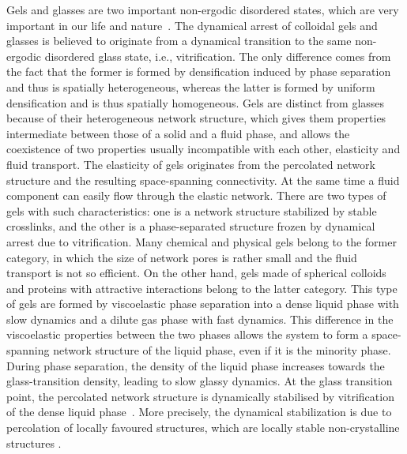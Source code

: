 \documentclass[twocolumn,showpacs,amsmath,amssymb,pre,superscriptaddress]{revtex4}
\begin{document}
\maketitle
Gels and glasses are two important non-ergodic disordered states, which are very important 
in our life and nature~\cite{anderson2002insights,lekkerkerker2011colloids}.
The dynamical arrest of colloidal gels and glasses is believed to originate from a dynamical transition to the same non-ergodic disordered glass state, i.e., vitrification. The only difference comes from the fact that the former is formed by densification induced by phase separation and thus is spatially heterogeneous, whereas the latter is formed by uniform densification and is thus spatially homogeneous.
Gels are distinct from glasses because of their heterogeneous network structure, which gives them properties intermediate between
those of a solid and a fluid phase, and allows the coexistence of two properties usually incompatible with each other, 
elasticity and fluid transport. 
The elasticity of gels originates from the percolated network structure and the resulting space-spanning connectivity. 
At the same time a fluid component can easily flow through the elastic network.
There are two types of gels with such characteristics: one is a network structure stabilized by stable crosslinks, and the other is a phase-separated structure frozen by dynamical arrest due to vitrification.
Many chemical and physical gels belong to the former category, in which the size of network pores is rather small and 
the fluid transport is not so efficient. On the other hand, gels made of spherical colloids and proteins 
with attractive interactions belong to the latter category. 
This type of gels are formed by viscoelastic phase separation \cite{tanaka1999colloid,tanaka2000viscoelastic} into a dense liquid phase with slow dynamics and a dilute gas phase 
with fast dynamics. This difference in the viscoelastic properties between the two phases allows the system to form a space-spanning 
network structure of the liquid phase, even if it is the minority phase. During phase separation, the density of the liquid phase 
increases towards the glass-transition density, leading to slow glassy dynamics.
At the glass transition point, the percolated network structure is dynamically stabilised by vitrification 
of the dense liquid phase~\cite{pusey1993dynamics,ilett1995phase,verhaegh1997transient,tanaka1999colloid,foffi2002,zaccarelli2007,lu2008gelation,zaccarelli2008gelation,testard2011}.  
More precisely, the dynamical stabilization is due to percolation of locally favoured structures, which are locally stable non-crystalline structures \cite{royall2008g}.
\end{document}
